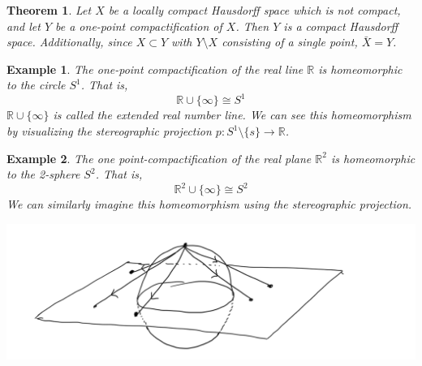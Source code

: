 \documentclass{article}
\newtheorem{theorem}{Theorem}[section]
\newtheorem{example}{Example}[section]
\theoremstyle{remark}
\theoremstyle{definition}
\begin{document}
\begin{theorem}
Let $X$ be a locally compact Hausdorff space which is not compact, and let $Y$ be a one-point compactification of $X$. Then $Y$ is a compact Hausdorff space. Additionally, since $X \subset Y$ with $Y \setminus X$ consisting of a single point, $\bar{X} = Y$. 
\end{theorem}

\begin{example}
The one-point compactification of the real line $\mathbb{R}$ is homeomorphic to the circle $S^1$. That is, 
\[\mathbb{R} \cup \{\infty\} \cong S^1\]
$\mathbb{R} \cup \{\infty\}$ is called the \textit{extended real number line}. We can see this homeomorphism by visualizing the stereographic projection $p: S^1 \setminus \{s\} \longrightarrow \mathbb{R}$. 

\begin{center}
\end{center}
\end{example}

\begin{example}
The one point-compactification of the real plane $\mathbb{R}^2$ is homeomorphic to the 2-sphere $S^2$. That is, 
\[\mathbb{R}^2 \cup \{\infty\} \cong S^2\]
We can similarly imagine this homeomorphism using the stereographic projection. 
\begin{center}
    \includegraphics[scale=0.23]{img/Two_Dim_Stereographic_Projection.PNG}
\end{center}
\end{example}
\end{document}
